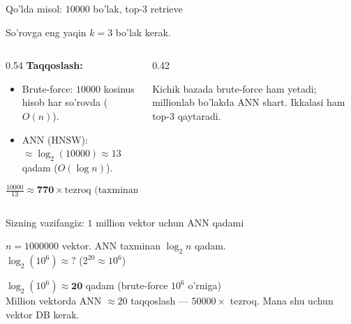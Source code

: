\documentclass[aspectratio=169,11pt]{beamer}
\begin{document}
\begin{frame}{Qo'lda misol: $10000$ bo'lak, top-3 retrieve}
  \begin{tcolorbox}[defbox,title={Bilim bazasi: $n=10000$ vektor}]
    \small So'rovga eng yaqin $k=3$ bo'lak kerak.
  \end{tcolorbox}
  \vspace{0.2em}
  \begin{columns}[T]
    \begin{column}{0.54\textwidth}
      \textbf{Taqqoslash:}
      \begin{itemize}\footnotesize\setlength\itemsep{2pt}
        \item Brute-force: $10000$ kosinus hisob har so'rovda ($O(n)$).
        \item ANN (HNSW): $\approx \log_2(10000) \approx 13$ qadam ($O(\log n)$).
      \end{itemize}
      $$ \tfrac{10000}{13} \approx \mathbf{770}\times \text{tezroq (taxminan)} $$
    \end{column}
    \begin{column}{0.42\textwidth}
      \begin{tcolorbox}[okbox,top=2pt,bottom=2pt]
        \footnotesize
        Kichik bazada brute-force ham yetadi; millionlab bo'lakda ANN shart.
        Ikkalasi ham top-3 qaytaradi.
      \end{tcolorbox}
    \end{column}
  \end{columns}
\end{frame}

\begin{frame}{Sizning vazifangiz: $1$ million vektor uchun ANN qadami}
  \begin{tcolorbox}[warnbox,title=Savol --- 60 soniya]
    \small
    $n = 1000000$ vektor. ANN taxminan $\log_2 n$ qadam.\\[4pt]
    \textbf{\large $\log_2(10^6) \approx ?$} \quad
    \footnotesize ($2^{20} \approx 10^6$)
  \end{tcolorbox}
  \pause
  \begin{tcolorbox}[okbox,title=Javob]
    \small
    $\log_2(10^6) \approx \mathbf{20}$ qadam (brute-force $10^6$ o'rniga)\\[3pt]
    \footnotesize Million vektorda ANN $\approx 20$ taqqoslash --- $50000\times$
    tezroq. Mana shu uchun vektor DB kerak.
  \end{tcolorbox}
\end{frame}
\end{document}

